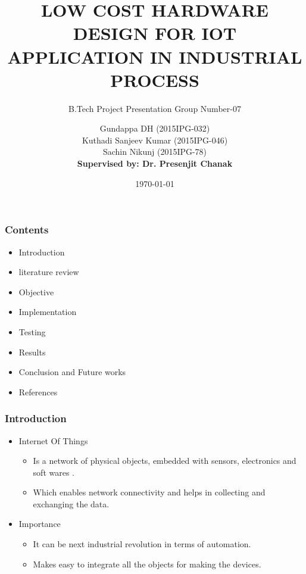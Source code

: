 \documentclass{beamer}
\title[IIT Roorkee]{LOW COST HARDWARE DESIGN FOR IOT
APPLICATION IN INDUSTRIAL PROCESS}
\author{B.Tech Project Presentation Group Number-07}
\author{Gundappa DH (2015IPG-032)\\
        Kuthadi Sanjeev Kumar (2015IPG-046)\\
        Sachin Nikunj (2015IPG-78)\\
\vspace{6mm}
\textbf{Supervised by: Dr. Presenjit Chanak}}
\institute[]{
	
	ABV-Indian Institute of Information Technology and\\
	Management, Gwalior
}
\date{\today}
\begin{document}
	\frame{\titlepage}
	
	
	\begin{frame}\frametitle{Contents}
	\begin{itemize}
		\item	Introduction
		\item   literature review 
		\item   Objective 
		\item	Implementation  
		\item   Testing
		\item	Results
		\item   Conclusion and Future works
		\item   References
	\end{itemize}
\end{frame}
\begin{frame}\frametitle{Introduction}
\begin{itemize}
\item Internet Of Things
\begin{itemize}
	\item Is a network of physical objects, embedded with sensors, electronics and soft wares .	 
	\item Which enables network connectivity and helps in collecting and exchanging the data.	  
\end{itemize}
\item Importance
\begin{itemize}
	\item It can be next industrial revolution in terms of automation. 
	\item Makes easy to integrate all the objects for making the devices.
\end{itemize}
\end{itemize}
\end{frame}
\end{document}
